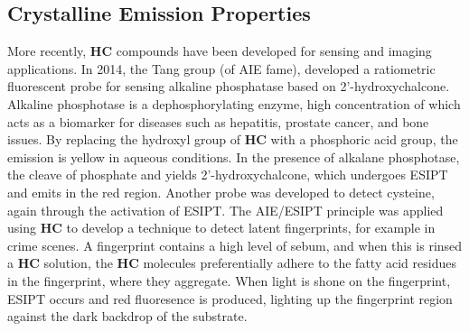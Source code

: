 \subsection{Crystalline Emission Properties}
More recently, \textbf{HC} compounds have been developed for sensing and imaging applications. In 2014, the Tang group (of \ac{AIE} fame), developed a ratiometric fluorescent probe for sensing alkaline phosphatase based on 2'-hydroxychalcone.\cite{Song2014} Alkaline phosphotase is a dephosphorylating  enzyme, high concentration of which acts as a biomarker for diseases such as hepatitis, prostate cancer, and bone issues. By replacing the hydroxyl group of \textbf{HC} with a phosphoric acid group, the emission is yellow in aqueous conditions. In the presence of alkalane phosphotase, the cleave of phosphate and yields 2'-hydroxychalcone, which undergoes \ac{ESIPT} and emits in the red region. Another probe was developed to detect cysteine, again through the activation of \ac{ESIPT}.\cite{Li2017a} The \ac{AIE}/\ac{ESIPT} principle was applied using \textbf{HC} to develop a technique to detect latent fingerprints, for example in crime scenes.\cite{Jin2015} A fingerprint contains a high level of sebum, and when this is rinsed a \textbf{HC} solution, the \textbf{HC} molecules preferentially adhere to the fatty acid residues in the fingerprint, where they aggregate. When light is shone on the fingerprint, \ac{ESIPT} occurs and red fluoresence is produced, lighting up the fingerprint region against the dark backdrop of the substrate. 


